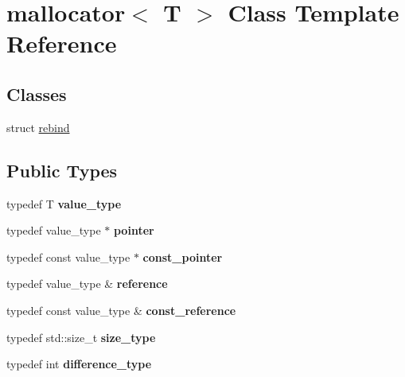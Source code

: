\hypertarget{classmallocator}{}\section{mallocator$<$ T $>$ Class Template Reference}
\label{classmallocator}
\subsection*{Classes}
\begin{DoxyCompactItemize}
\item 
struct \hyperlink{structmallocator_1_1rebind}{rebind}
\end{DoxyCompactItemize}
\subsection*{Public Types}
\begin{DoxyCompactItemize}
\item 
\hypertarget{classmallocator_aa92b951ebd7f747f7e97c51af305e5bc}{}typedef T {\bfseries value\+\_\+type}\label{classmallocator_aa92b951ebd7f747f7e97c51af305e5bc}

\item 
\hypertarget{classmallocator_a8bcf8d9d0264f17f970c643f897e0568}{}typedef value\+\_\+type $\ast$ {\bfseries pointer}\label{classmallocator_a8bcf8d9d0264f17f970c643f897e0568}

\item 
\hypertarget{classmallocator_a3b2561c9c6110281d4f56e37f371cb85}{}typedef const value\+\_\+type $\ast$ {\bfseries const\+\_\+pointer}\label{classmallocator_a3b2561c9c6110281d4f56e37f371cb85}

\item 
\hypertarget{classmallocator_a1e691aae1210d7d0240a487640651be7}{}typedef value\+\_\+type \& {\bfseries reference}\label{classmallocator_a1e691aae1210d7d0240a487640651be7}

\item 
\hypertarget{classmallocator_a39becf0d8f0652db8cd8e8590298ab63}{}typedef const value\+\_\+type \& {\bfseries const\+\_\+reference}\label{classmallocator_a39becf0d8f0652db8cd8e8590298ab63}

\item 
\hypertarget{classmallocator_a1f0163e71f684ca31e1a2789ad86fd0e}{}typedef std\+::size\+\_\+t {\bfseries size\+\_\+type}\label{classmallocator_a1f0163e71f684ca31e1a2789ad86fd0e}

\item 
\hypertarget{classmallocator_abe4088213e5324862f9ade948471b7a4}{}typedef int {\bfseries difference\+\_\+type}\label{classmallocator_abe4088213e5324862f9ade948471b7a4}

\end{DoxyCompactItemize}
